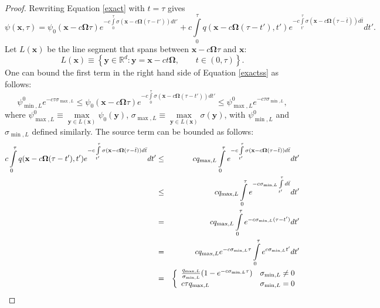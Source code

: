 \begin{proof}
   Rewriting Equation \eqref{exact} with $t=\tau$ gives
   \[
      \psi(\mathbf{x},\tau) = \psi_0(\mathbf{x} - c\mathbf{\Omega}\tau)
         e^{-c\int\limits_0^\tau \sigma(\mathbf{x} - c\mathbf{\Omega}(\tau -t'))dt'} +
         c \int\limits_0^\tau q(\mathbf{x} - c\mathbf{\Omega}(\tau -t'),t')
         e^{-c\int\limits_{t'}^\tau\sigma(\mathbf{x}
         - c\mathbf{\Omega}(\tau -\bar{t}))d\bar{t}} dt'.
   \]
   Let $L(\mathbf{x})$ be the line segment that spans between 
   $\mathbf{x}-c\mathbf{\Omega}\tau$ and $\mathbf{x}$:
   \[
      L(\mathbf{x})\equiv \left\{\mathbf{y}\in\mathbb{R}^d : \mathbf{y}
         = \mathbf{x}-ct\mathbf{\Omega},\qquad t\in(0,\tau) \right\}.
   \]
   One can bound the first term in the right hand side of Equation \eqref{exactss}
   as follows:
   \[
      \psi_{\min,L}^0 e^{-c\tau\sigma_{\max,L}} \le
      \psi_0(\mathbf{x} - c\mathbf{\Omega}\tau)
         e^{-c\int\limits_0^\tau \sigma(\mathbf{x} - c\mathbf{\Omega}(\tau -t'))dt'} \le
      \psi_{\max,L}^0 e^{-c\tau\sigma_{\min,L}},
   \]
   where $\psi_{\max,L}^0 \equiv\max\limits_{\mathbf{y}\in L(\mathbf{x})}\psi_0(\mathbf{y})$,
   $\sigma_{\max,L}\equiv\max\limits_{\mathbf{y}\in L(\mathbf{x})}\sigma(\mathbf{y})$,
   with $\psi_{\min,L}^0$ and $\sigma_{\min,L}$
   defined similarly.
   The source term can be bounded as follows:
   \begin{eqnarray*}
      c \int\limits_0^\tau q(\mathbf{x} - c\mathbf{\Omega}(\tau -t'),t')
         e^{-c\int\limits_{t'}^\tau\sigma(\mathbf{x}
         - c\mathbf{\Omega}(\tau -\bar{t}))d\bar{t}} dt' & \le &
         c q_{\max,L}\int\limits_0^\tau 
         e^{-c\int\limits_{t'}^\tau\sigma(\mathbf{x}
         - c\mathbf{\Omega}(\tau -\bar{t}))d\bar{t}} dt'\\
      & \le & c q_{\max,L}\int\limits_0^\tau 
         e^{-c\sigma_{\min,L}\int\limits_{t'}^\tau d\bar{t}} dt'\\
      & = & c q_{\max,L} \int\limits_0^\tau e^{-c\sigma_{\min,L}(\tau-t')} dt'\\
      & = & c q_{\max,L}e^{-c\sigma_{\min,L}\tau}
         \int\limits_0^\tau e^{c\sigma_{\min,L}t'} dt'\\
      & = & \left\{\begin{array}{l l}
            \frac{q_{\max,L}}{\sigma_{\min,L}}(1 - e^{-c\sigma_{\min,L}\tau})
               & \sigma_{\min,L} \ne 0\\
            c\tau q_{\max,L} & \sigma_{\min,L} = 0
            \end{array}\right.

\end{eqnarray*}
\end{proof}
